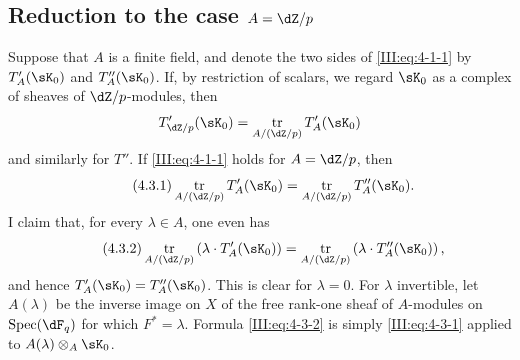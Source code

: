 \documentclass[12pt,oneside,english]{smfbook}
\DeclareMathOperator{\spec}{Spec}
\DeclareMathOperator{\tr}{tr}
\begin{document}
\subsection{Reduction to the case \texorpdfstring{$A=\dZ/p$}{A=Z/p}}\label{III:4-3}

Suppose that $A$ is a finite field, and denote the two sides of \eqref{III:eq:4-1-1} by $T_A'(\sK_0)$ and $T_A''(\sK_0)$. If, by restriction of scalars, we regard $\sK_0$ as a complex of sheaves of $\dZ/p$-modules, then
\[
  T_{\dZ/p}'(\sK_0) = \tr_{A/(\dZ/p)} T_A'(\sK_0)
\]
and similarly for $T''$. If \eqref{III:eq:4-1-1} holds for $A=\dZ/p$, then
\begin{equation*}\tag{4.3.1}\label{III:eq:4-3-1}
  \tr_{A/(\dZ/p)} T_A'(\sK_0) = \tr_{A/(\dZ/p)} T_A''(\sK_0) \text{.}
\end{equation*}
I claim that, for every $\lambda\in A$, one even has
\begin{equation*}\tag{4.3.2}\label{III:eq:4-3-2}
  \tr_{A/(\dZ/p)}\left(\lambda\cdot T_A'(\sK_0)\right) = \tr_{A/(\dZ/p)}\left(\lambda\cdot T_A''(\sK_0)\right) \text{,}
\end{equation*}
and hence $T_A'(\sK_0)=T_A''(\sK_0)$. This is clear for $\lambda=0$. For $\lambda$ invertible, let $A(\lambda)$ be the inverse image on $X$ of the free rank-one sheaf of $A$-modules on $\spec(\dF_q)$ for which $F^*=\lambda$. Formula \eqref{III:eq:4-3-2} is simply \eqref{III:eq:4-3-1} applied to $A(\lambda)\otimes_A\sK_0$.
\end{document}
